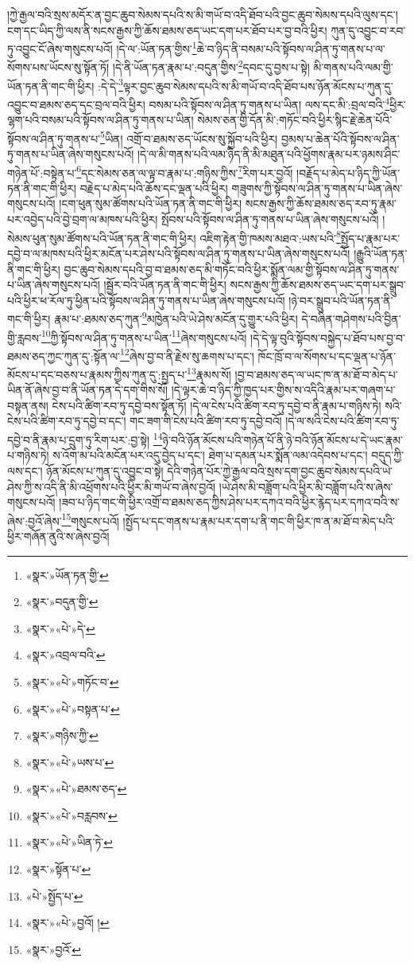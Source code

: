 །ཀྱེ་རྒྱལ་བའི་སྲས་མདོར་ན་བྱང་ཆུབ་སེམས་དཔའི་ས་མི་གཡོ་བ་འདི་ཐོབ་པའི་བྱང་ཆུབ་སེམས་དཔའི་ལུས་དང་། ངག་དང་ཡིད་ཀྱི་ལས་ནི་སངས་རྒྱས་ཀྱི་ཆོས་ཐམས་ཅད་ཡང་དག་པར་ཐོབ་པར་བྱ་བའི་ཕྱིར། ཀུན་དུ་འབྱུང་བ་རབ་ཏུ་འབྱུང་ངོ་ཞེས་གསུངས་པའོ། །དེ་ལ་:ཡོན་ཏན་གྱིས་\footnote{«སྣར་»ཡོན་ཏན་གྱི་}ཆེ་བ་ཉིད་ནི་བསམ་པའི་སྟོབས་ལ་ཤིན་ཏུ་གནས་པ་ལ་སོགས་པས་ཡོངས་སུ་སྟོན་ཏོ། །དེ་ནི་ཡོན་ཏན་རྣམ་པ་:བདུན་གྱིས་\footnote{«སྣར་»བདུན་གྱི་}དབང་དུ་བྱས་པ་སྟེ། མི་གནས་པའི་ལམ་གྱི་ཡོན་ཏན་ནི་གང་གི་ཕྱིར། :དེ་དེ་\footnote{«སྣར་»«པེ་»དེ་}ལྟར་བྱང་ཆུབ་སེམས་དཔའི་ས་མི་གཡོ་བ་འདི་ཐོབ་པས་ཉོན་མོངས་པ་ཀུན་དུ་འབྱུང་བ་ཐམས་ཅད་དང་བྲལ་བའི་ཕྱིར། བསམ་པའི་སྟོབས་ལ་ཤིན་ཏུ་གནས་པ་ཡིན། ལས་དང་མི་:བྲལ་བའི་\footnote{«སྣར་»འབྲལ་བའི་}ཕྱིར་ལྷག་པའི་བསམ་པའི་སྟོབས་ལ་ཤིན་ཏུ་གནས་པ་ཡིན། སེམས་ཅན་གྱི་དོན་མི་:གཏོང་བའི་ཕྱིར་སྙིང་རྗེ་ཆེན་པོའི་སྟོབས་ལ་ཤིན་ཏུ་གནས་པ་\footnote{«སྣར་»«པེ་»གཏོང་བ་}ཡིན། འགྲོ་བ་ཐམས་ཅད་ཡོངས་སུ་སྐྱོབ་པའི་ཕྱིར། བྱམས་པ་ཆེན་པོའི་སྟོབས་ལ་ཤིན་ཏུ་གནས་པ་ཡིན་ཞེས་གསུངས་པའོ། །དེ་ལ་མི་གནས་པའི་ལམ་ཉིད་ནི་མི་མཐུན་པའི་ཕྱོགས་རྣམ་པར་ཉམས་ཤིང་གཉེན་པོ་:བསྟེན་པ་\footnote{«སྣར་»«པེ་»བསྟན་པ་}དང་སེམས་ཅན་ལ་ལྟ་བ་རྣམ་པ་:གཉིས་ཀྱིས་\footnote{«སྣར་»གཉིས་ཀྱི་}རིག་པར་བྱའོ། །བརྗོད་པ་མེད་པ་ཉིད་ཀྱི་ཡོན་ཏན་ནི་གང་གི་ཕྱིར། བརྗེད་པ་མེད་པའི་ཆོས་དང་ལྡན་པའི་ཕྱིར། གཟུགས་ཀྱི་སྟོབས་ལ་ཤིན་ཏུ་གནས་པ་ཡིན་ཞེས་གསུངས་པའོ། །ངག་ཕུན་སུམ་ཚོགས་པའི་ཡོན་ཏན་ནི་གང་གི་ཕྱིར། སངས་རྒྱས་ཀྱི་ཆོས་ཐམས་ཅད་རབ་ཏུ་རྣམ་པར་འབྱེད་པའི་བྱེ་བྲག་ལ་མཁས་པའི་ཕྱིར། སྤོབས་པའི་སྟོབས་ལ་ཤིན་ཏུ་གནས་པ་ཡིན་ཞེས་གསུངས་པའོ། །སེམས་ཕུན་སུམ་ཚོགས་པའི་ཡོན་ཏན་ནི་གང་གི་ཕྱིར། འཇིག་རྟེན་གྱི་ཁམས་མཐའ་:ཡས་པའི་\footnote{«སྣར་»«པེ་»ཡས་པ་}སྤྱོད་པ་རྣམ་པར་དབྱེ་བ་ལ་མཁས་པའི་ཕྱིར་མངོན་པར་ཤེས་པའི་སྟོབས་ལ་ཤིན་ཏུ་གནས་པ་ཡིན་ཞེས་གསུངས་པའོ། །རྒྱུའི་ཡོན་ཏན་ནི་གང་གི་ཕྱིར། བྱང་ཆུབ་སེམས་དཔའི་བྱ་བ་ཐམས་ཅད་མི་གཏོང་བའི་ཕྱིར་སྨོན་ལམ་གྱི་སྟོབས་ལ་ཤིན་ཏུ་གནས་པ་ཡིན་ཞེས་གསུངས་པའོ། །སྦྱོར་བའི་ཡོན་ཏན་ནི་གང་གི་ཕྱིར། སངས་རྒྱས་ཀྱི་ཆོས་ཐམས་ཅད་ཡང་དག་པར་སྒྲུབ་པའི་ཕྱིར་ཕ་རོལ་ཏུ་ཕྱིན་པའི་སྟོབས་ལ་ཤིན་ཏུ་གནས་པ་ཡིན་ཞེས་གསུངས་པའོ། །ཉེ་བར་སྒྲུབ་པའི་ཡོན་ཏན་ནི་གང་གི་ཕྱིར། རྣམ་པ་:ཐམས་ཅད་ཀུན་\footnote{«སྣར་»«པེ་»ཐམས་ཅད་}མཁྱེན་པའི་ཡེ་ཤེས་མངོན་དུ་གྱུར་པའི་ཕྱིར། དེ་བཞིན་གཤེགས་པའི་བྱིན་གྱི་རླབས་\footnote{«སྣར་»«པེ་»བརླབས་}ཀྱི་སྟོབས་ལ་ཤིན་ཏུ་གནས་པ་ཡིན་\footnote{«སྣར་»«པེ་»ཡིན་ཏེ་}ཞེས་གསུངས་པའོ། །དེ་དེ་ལྟ་བུའི་སྟོབས་བསྐྱེད་པ་ཐོབ་པས་བྱ་བ་ཐམས་ཅད་ཀྱང་ཀུན་དུ་:སྟོན་ལ་\footnote{«སྣར་»སྟོན་པ་}ཞེས་བྱ་བ་ནི་རྗེས་སུ་ཆགས་པ་དང་། ཁོང་ཁྲོ་བ་ལ་སོགས་པ་དང་ལྡན་པ་ཉོན་མོངས་པ་དང་བཅས་པ་རྣམས་ཀྱིས་ཀུན་དུ་:སྤྱད་པ་\footnote{«པེ་»སྤྱོད་པ་}རྣམས་སོ། །བྱ་བ་ཐམས་ཅད་ལ་ཡང་ཁ་ན་མ་ཐོ་བ་མེད་པ་ཡིན་ནོ་ཞེས་བྱ་བ་ནི་ཡོན་ཏན་དེ་དག་གིས་སོ། །དེ་ལྟར་ཆེ་བ་ཉིད་ཀྱི་ཁྱད་པར་གྱིས་ས་འདིའི་རྣམ་པར་གཞག་པ་བསྟན་ནས། ངེས་པའི་ཚིག་རབ་ཏུ་དབྱེ་བས་སྟོན་ཏོ། །དེ་ལ་ངེས་པའི་ཚིག་རབ་ཏུ་དབྱེ་བ་ནི་རྣམ་པ་གཉིས་ཏེ། སའི་ངེས་པའི་ཚིག་རབ་ཏུ་དབྱེ་བ་དང་། གང་ཟག་གི་ངེས་པའི་ཚིག་རབ་ཏུ་དབྱེ་བའོ། །དེ་ལ་སའི་ངེས་པའི་ཚིག་རབ་ཏུ་དབྱེ་བ་ནི་རྣམ་པ་དྲུག་ཏུ་རིག་པར་:བྱ་སྟེ། \footnote{«སྣར་»«པེ་»བྱའོ། ། }ཉེ་བའི་ཉོན་མོངས་པའི་གཉེན་པོ་ནི་ཉེ་བའི་ཉོན་མོངས་པ་དེ་ཡང་རྣམ་པ་གཉིས་ཏེ། ས་འོག་མ་པའི་མངོན་པར་འདུ་བྱེད་པ་དང་། ཐེག་པ་དམན་པར་སྨོན་ལམ་འདེབས་པ་དང་། བདུད་ཀྱི་ལས་དང་། ཉོན་མོངས་པ་ཀུན་དུ་འབྱུང་བ་སྟེ། དེའི་གཉེན་པོར་ཀྱེ་རྒྱལ་བའི་སྲས་དག་བྱང་ཆུབ་སེམས་དཔའི་ཡེ་ཤེས་ཀྱི་ས་འདི་ནི་མི་འཕྲོགས་པའི་ཕྱིར་མི་གཡོ་བ་ཞེས་བྱའོ། །ཡེ་ཤེས་མི་བཟློག་པའི་ཕྱིར་མི་བཟློག་པའི་ས་ཞེས་གསུངས་པའོ། །ཟབ་པ་ཉིད་གང་གི་ཕྱིར་འགྲོ་བ་ཐམས་ཅད་ཀྱིས་ཤེས་པར་དཀའ་བའི་ཕྱིར་རྙེད་པར་དཀའ་བའི་ས་ཞེས་:བྱའོ་ཞེས་\footnote{«སྣར་»བྱའོ་}གསུངས་པའོ། །སྤྱོད་པ་དང་གནས་པ་རྣམ་པར་དག་པ་ནི་གང་གི་ཕྱིར་ཁ་ན་མ་ཐོ་བ་མེད་པའི་ཕྱིར་གཞོན་ནུའི་ས་ཞེས་བྱའོ། 